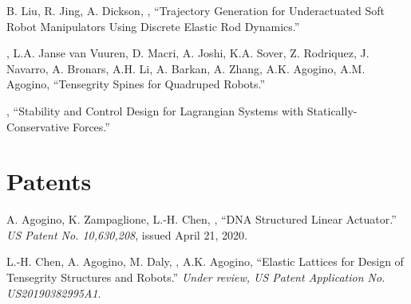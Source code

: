\documentclass[letterpaper]{deedy-resume} %
\newcommand{\myname}{\underline{{\fontdescript{A.P. Sabelhaus}}}}
\newcommand{\ranname}{R. Jing}
\newcommand{\akuaname}{A. Dickson}
\newcommand{\beibeiname}{B. Liu}
\begin{document}
{\vspace{0.1cm}

\begin{etaremune}[itemsep=0.1cm]

\item \beibeiname, \ranname, \akuaname, \myname, ``Trajectory Generation for Underactuated Soft Robot Manipulators Using Discrete Elastic Rod Dynamics.''

\item \underline{{}}, L.A. Janse van Vuuren, D. Macri, A. Joshi, K.A. Sover, Z. Rodriquez, J. Navarro, A. Bronars, A.H. Li, A. Barkan, A. Zhang, A.K. Agogino, A.M. Agogino, ``Tensegrity Spines for Quadruped Robots.''

\item \underline{{}}, ``Stability and Control Design for Lagrangian Systems with Statically-Conservative Forces.''

\end{etaremune}


\section{Patents}

\vspace{0.1cm}

\begin{etaremune}[itemsep=0.1cm]

\item A. Agogino, K. Zampaglione, L.-H. Chen, \underline{{}}, ``DNA Structured Linear Actuator.'' {\it US Patent No. 10,630,208}, issued April 21, 2020.

\item L.-H. Chen, A. Agogino, M. Daly, \underline{{}}, A.K. Agogino, ``Elastic Lattices for Design of Tensegrity Structures and Robots.'' {\it Under review, US Patent Application No. US20190382995A1}.

\end{etaremune}


}
\end{document}
